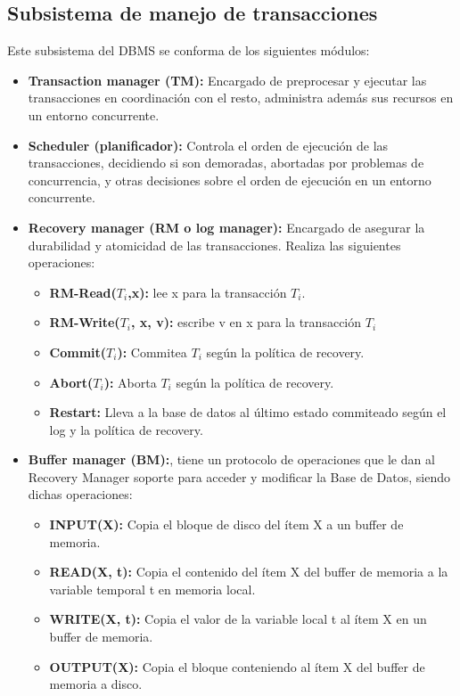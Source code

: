 \subsection*{Subsistema de manejo de transacciones}
Este subsistema del DBMS se conforma de los siguientes módulos:
\begin{itemize}
    \item \textbf{Transaction manager (TM):} Encargado de preprocesar y ejecutar las transacciones en coordinación con el resto, administra además sus recursos en un entorno concurrente.
    \item \textbf{Scheduler (planificador):} Controla el orden de ejecución de las transacciones, decidiendo si son demoradas, abortadas por problemas de concurrencia, y otras decisiones sobre el orden de ejecución en un entorno concurrente.
    \item \textbf{Recovery manager (RM o log manager):} Encargado de asegurar la durabilidad y atomicidad de las transacciones. Realiza las siguientes operaciones:
    \begin{itemize}
        \item \textbf{RM-Read($T_i$,x):} lee x para la transacción $T_i$.
        \item \textbf{RM-Write($T_i$, x, v):} escribe v en x para la transacción $T_i$
        \item \textbf{Commit($T_i$):} Commitea $T_i$ según la política de recovery.
        \item \textbf{Abort($T_i$):} Aborta $T_i$ según la política de recovery.
        \item \textbf{Restart:} Lleva a la base de datos al último estado commiteado según el log y la política de recovery.
    \end{itemize}
    \item \textbf{Buffer manager (BM):}, tiene un protocolo de operaciones que le dan al Recovery Manager soporte para acceder y modificar la Base de Datos, siendo dichas operaciones:
    \begin{itemize}
        \item \textbf{INPUT(X):} Copia el bloque de disco del ítem X a un buffer de memoria.
        \item \textbf{READ(X, t):} Copia el contenido del ítem X del buffer de memoria a la variable temporal t en memoria local.
        \item \textbf{WRITE(X, t):} Copia el valor de la variable local t al ítem X en un buffer de memoria.
        \item \textbf{OUTPUT(X):} Copia el bloque conteniendo al ítem X del buffer de memoria a disco.

\end{itemize}
\end{itemize}
